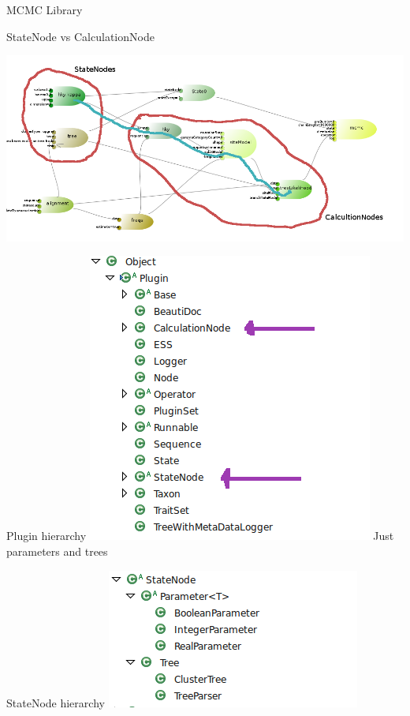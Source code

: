 \documentclass{beamer}
\theoremstyle{definition}
\begin{document}
\begin{frame}{MCMC Library}

StateNode vs CalculationNode

\includegraphics[width=\textwidth]{hky.png}

\end{frame}


\begin{frame}[containsverbatim]{Plugin hierarchy}
\includegraphics{hierarchy1.png}
Just parameters and trees
\end{frame}

\begin{frame}[containsverbatim]{StateNode hierarchy}
\includegraphics[width=\textwidth]{hierarchy3.png}
\end{frame}
\end{document}
